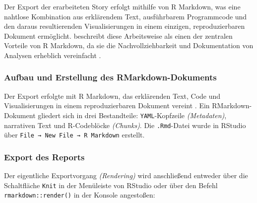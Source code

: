 Der Export der erarbeiteten Story erfolgt mithilfe von R Markdown, was eine nahtlose Kombination aus erklärendem Text, ausführbarem Programmcode und den daraus resultierenden Visualisierungen in einem einzigen, reproduzierbaren Dokument ermöglicht. \citeauthor{3} beschreibt diese Arbeitsweise als einen der zentralen Vorteile von R Markdown, da sie die Nachvollziehbarkeit und Dokumentation von Analysen erheblich vereinfacht \cite[55-59]{3}.

\subsubsection{Aufbau und Erstellung des RMarkdown-Dokuments}

Der Export erfolgte mit R Markdown, das erklärenden Text, Code und Visualisierungen in einem reproduzierbaren Dokument vereint \cite[55-59]{3}. Ein RMarkdown-Dokument gliedert sich in drei Bestandteile: \texttt{YAML}-Kopfzeile \textit{(Metadaten)}, narrativen Text und R-Codeblöcke \textit{(Chunks)}. Die \texttt{.Rmd}-Datei wurde in RStudio über \texttt{File → New File → R Markdown} erstellt.

\begin{minipage}[t]{0.48\textwidth}
    
\end{minipage}
\hfill
\begin{minipage}[t]{0.48\textwidth}
    
\end{minipage}%
\vspace{-2\baselineskip}%
\captionsetup{hypcap=false}%
%
\label{lst:df-rmd}%

\subsubsection{Export des Reports}

Der eigentliche Exportvorgang \textit{(Rendering)} wird anschließend entweder über die Schaltfläche \texttt{Knit} in der Menüleiste von RStudio oder über den Befehl \texttt{rmarkdown::render()} in der Konsole angestoßen:

